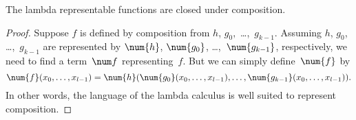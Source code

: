 \documentclass[../../../include/open-logic-section]{subfiles}
\begin{document}

\begin{lem}
The lambda representable functions are closed under composition.
\end{lem}

\begin{proof}
Suppose $f$ is defined by composition from $h$, $g_0,$
\dots,~$g_{k-1}$. Assuming $h$, $g_0$, \dots,~$g_{k-1}$ are
represented by $\num{h}$, $\num{g_0}$, \dots,~$\num{g_{k-1}}$,
respectively, we need to find a term~$\num f$ representing~$f$. But we
can simply define~$\num{f}$ by
\[
\num{f}(x_0, \dots, x_{l-1}) = \num{h}(\num{g_0}(x_0, \dots, x_{l-1}),
\dots, \num{g_{k-1}}(x_0, \dots, x_{l-1})).
\]
In other words, the language of the lambda calculus is well suited to
represent composition.
\end{proof}
\end{document}
